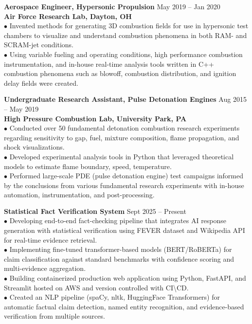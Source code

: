 \documentclass[10pt]{article}
\renewcommand{\section}[2]%
        {\pagebreak[3]\vspace{0.75\baselineskip}%
         \phantomsection\addcontentsline{toc}{section}{#1}%
         \hspace{0in}%
         \marginpar{
         \raggedright \small \scshape #1}#2}
\newcommand{\blankline}{\quad\pagebreak[2]\vspace{-0.3\baselineskip}}
\begin{document}
\blankline

\textbf{Aerospace Engineer, Hypersonic Propulsion}
\hfill May 2019 -- Jan 2020 \\
\textbf{Air Force Research Lab, Dayton, OH} \\
$\bullet$ Invented methods for generating 3D combustion fields for use in hypersonic test chambers to visualize and understand combustion phenomena in both RAM- and SCRAM-jet conditions. \\
$\bullet$ Using variable fueling and operating conditions, high performance combustion instrumentation, and in-house real-time analysis tools written in C++ combustion phenomena such as blowoff, combustion distribution, and ignition delay fields were created. \\

\blankline

\textbf{Undergraduate Research Assistant, Pulse Detonation Engines}
\hfill Aug 2015 -- May 2019 \\
\textbf{High Pressure Combustion Lab, University Park, PA} \\
$\bullet$ Conducted over 50 fundamental detonation combustion research experiments regarding sensitivity to gap, fuel, mixture composition, flame propagation, and shock visualizations. \\
$\bullet$ Developed experimental analysis tools in Python that leveraged theoretical models to estimate flame boundary, speed, temperature. \\
$\bullet$ Performed large-scale PDE (pulse detonation engine) test campaigns informed by the conclusions from various fundamental research experiments with in-house automation, instrumentation, and post-processing.

\section{Projects}


\textbf{Statistical Fact Verification System} \hfill Sept 2025 -- Present \\
$\bullet$ Developing end-to-end fact-checking pipeline that integrates AI response generation with statistical verification using FEVER dataset and Wikipedia API for real-time evidence retrieval. \\
$\bullet$ Implementing fine-tuned transformer-based models (BERT/RoBERTa) for claim classification against standard benchmarks with confidence scoring and multi-evidence aggregation. \\
$\bullet$ Building containerized production web application using Python, FastAPI, and Streamlit hosted on AWS and version controlled with CI\textbackslash CD. \\
$\bullet$ Created an NLP pipeline (spaCy, nltk, HuggingFace Transformers) for automatic factual claim detection, named entity recognition, and evidence-based verification from multiple sources.
\end{document}
